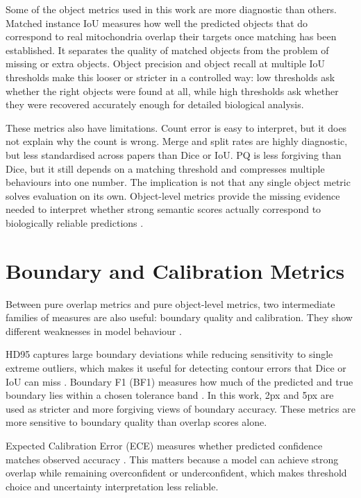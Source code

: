 \documentclass[logo,bsc,singlespacing,parskip,online]{infthesis}
\begin{document}
Some of the object metrics used in this work are more diagnostic than others. Matched
instance IoU measures how well the predicted objects that do correspond to real
mitochondria overlap their targets once matching has been established. 
It separates the quality of matched objects from the problem of
missing or extra objects. Object precision and object recall at multiple IoU
thresholds make this looser or stricter in a controlled way: low thresholds ask
whether the right objects were found at all, while high thresholds ask whether
they were recovered accurately enough for detailed biological analysis.

These metrics also have limitations. Count error is easy to interpret, but it
does not explain why the count is wrong. Merge and split rates are highly
diagnostic, but less standardised across papers than Dice or IoU. PQ is less
forgiving than Dice, but it still depends on a matching threshold and
compresses multiple behaviours into one number. The implication is not that any
single object metric solves evaluation on its own. Object-level metrics
provide the missing evidence needed to interpret whether strong semantic scores
actually correspond to biologically reliable predictions
\citep{wei2020mitoem, conrad2023instance}. 

\section{Boundary and Calibration Metrics}

Between pure overlap metrics and pure object-level metrics, two intermediate
families of measures are also useful: boundary quality and calibration. They
show different weaknesses in model behaviour
\citep{taha2015metrics, guo2017calibration}.

HD95 captures large boundary deviations while reducing sensitivity to single
extreme outliers, which makes it useful for detecting contour errors that Dice
or IoU can miss \citep{taha2015metrics}. Boundary F1 (BF1) measures
how much of the predicted and true boundary lies within a chosen tolerance
band \citep{martin2001segmentation}. In this work, 2px and 5px are used
as stricter and more forgiving views of boundary accuracy. These metrics are more sensitive 
to boundary quality than overlap scores alone.

Expected Calibration Error (ECE) measures whether predicted confidence matches
observed accuracy \citep{guo2017calibration}. This matters because a model can
achieve strong overlap while remaining overconfident or underconfident, which
makes threshold choice and uncertainty interpretation less reliable.
\end{document}
